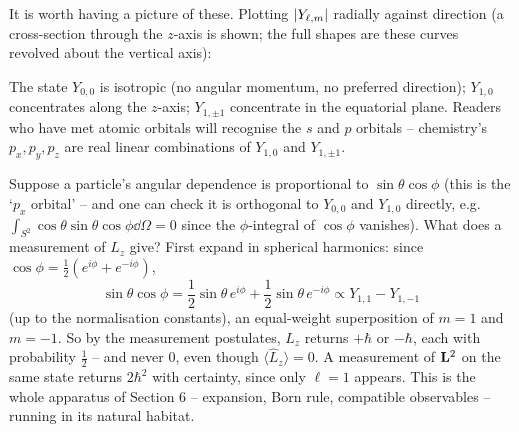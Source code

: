 \documentclass[a4paper]{scrartcl}
\begin{document}
It is worth having a picture of these. Plotting $\lvert Y_{\ell,m}\rvert$ radially against direction (a cross-section through the $z$-axis is shown; the full shapes are these curves revolved about the vertical axis):

\begin{center}
\end{center}

The state $Y_{0,0}$ is isotropic (no angular momentum, no preferred direction); $Y_{1,0}$ concentrates along the $z$-axis; $Y_{1,\pm1}$ concentrate in the equatorial plane. Readers who have met atomic orbitals will recognise the $s$ and $p$ orbitals -- chemistry's $p_x, p_y, p_z$ are real linear combinations of $Y_{1,0}$ and $Y_{1, \pm 1}$.

\begin{example}[Measuring $L_z$]
    Suppose a particle's angular dependence is proportional to $\sin\theta\cos\phi$ (this is the `$p_x$ orbital' -- and one can check it is orthogonal to $Y_{0,0}$ and $Y_{1,0}$ directly, e.g.\ $\int_{S^2} \cos\theta \sin\theta\cos\phi \dd \Omega = 0$ since the $\phi$-integral of $\cos\phi$ vanishes). What does a measurement of $L_z$ give? First expand in spherical harmonics: since $\cos \phi = \frac{1}{2}(e^{i\phi} + e^{-i\phi})$,
    $$
    \sin\theta\cos\phi = \frac{1}{2}\sin\theta \, e^{i \phi} + \frac{1}{2} \sin \theta \, e^{-i\phi} \propto Y_{1,1} - Y_{1,-1}
    $$
    (up to the normalisation constants), an equal-weight superposition of $m = 1$ and $m = -1$. So by the measurement postulates, $L_z$ returns $+\hbar$ or $-\hbar$, each with probability $\frac{1}{2}$ -- and never $0$, even though $\langle \hat{L}_z \rangle = 0$. A measurement of $\mathbf{L}^2$ on the same state returns $2\hbar^2$ with certainty, since only $\ell = 1$ appears. This is the whole apparatus of Section 6 -- expansion, Born rule, compatible observables -- running in its natural habitat.
\end{example}
\end{document}
